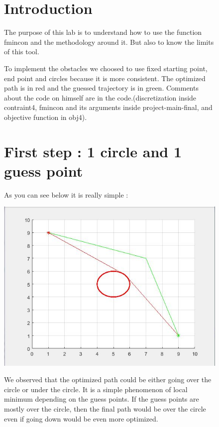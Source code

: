 \begin{figure}
\vspace{-10mm}
\section{Introduction}

The purpose of this lab is to understand how to use the function fmincon and the methodology around it. But also to know the limits of this tool.
\vspace{5mm}

To implement the obstacles we choosed to use fixed starting point, end point and circles because it is more consistent. The optimized path is in red and the guessed trajectory is in green.
\vspace{5mm}
Comments about the code on himself are in the code.(discretization inside contraint4, fmincon and its arguments inside project-main-final, and objective function in obj4).
\vspace{5mm}
\section{First step : 1 circle and 1 guess point}
As you can see below it is really simple :

\begin{center}
\includegraphics[width=1\textwidth]{level1.JPG}
\end{center}
\vspace{5mm}
We observed that the optimized path could be either going over the circle or under the circle. It is a simple phenomenon of local minimum depending on the guess points. If the guess points are mostly over the circle, then the final path would be over the circle even if going down would be even more optimized.

\end{figure}

